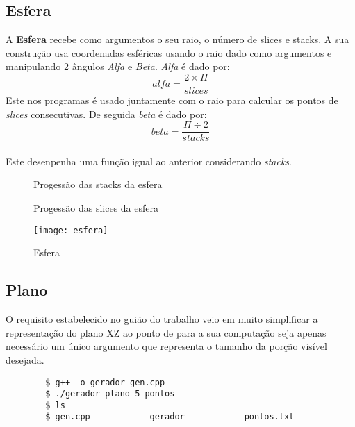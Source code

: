 \documentclass{article}
\begin{document}
\subsection{Esfera}
A \textbf{Esfera} recebe como argumentos o seu raio, o número de slices e stacks.
A sua construção usa coordenadas esféricas usando o raio dado como argumentos e manipulando 2 ângulos \textit{Alfa} e \textit{Beta}. \textit{Alfa} é dado por: \\
\[ alfa = \frac{2\times \Pi}{slices} \]
Este nos programas é usado juntamente com o raio para calcular os pontos de \textit{slices} consecutivas. De seguida \textit{beta} é dado por:\\
\[ beta = \frac{\Pi \div 2}{stacks}\] \\
Este desenpenha uma função igual ao anterior considerando \textit{stacks}.\\


\begin{figure}[H]
	\centering
	\hspace{2cm}
	\caption{Progessão das stacks da esfera}
\end{figure}

\begin{figure}[H]
	\centering
	\hspace{2cm}
	\caption{Progessão das slices da esfera}
\end{figure}

\begin{figure}[H]
	\centering
	\texttt{[image: esfera]}
	\caption{Esfera}
\end{figure}

\subsection{Plano}
O requisito estabelecido no guião do trabalho veio em muito simplificar a representação do plano XZ ao ponto de para a sua computação seja apenas necessário um único argumento que representa o tamanho da porção visível desejada.  

\begin{commandline}
    \begin{verbatim}
        $ g++ -o gerador gen.cpp
        $ ./gerador plano 5 pontos
        $ ls
        $ gen.cpp            gerador            pontos.txt
    \end{verbatim}
\end{commandline}
\end{document}
